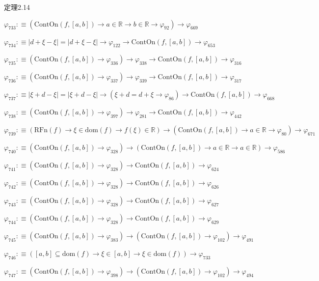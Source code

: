 \begin{fullproof}{定理2.14}
\begin{abbrevlist}
\item $\varphi_{733} :\equiv (\mathrm{ContOn}(f,[a,b]) \to a \in \mathbb{R} \to b \in \mathbb{R} \to \varphi_{92}) \to \varphi_{669}$
\item $\varphi_{734} :\equiv \lvert d + \xi - \xi \rvert = \lvert d + \xi - \xi \rvert \to \varphi_{122} \to \mathrm{ContOn}(f,[a,b]) \to \varphi_{653}$
\item $\varphi_{735} :\equiv (\mathrm{ContOn}(f,[a,b]) \to \varphi_{336}) \to \varphi_{338} \to \mathrm{ContOn}(f,[a,b]) \to \varphi_{316}$
\item $\varphi_{736} :\equiv (\mathrm{ContOn}(f,[a,b]) \to \varphi_{337}) \to \varphi_{339} \to \mathrm{ContOn}(f,[a,b]) \to \varphi_{317}$
\item $\varphi_{737} :\equiv \lvert \xi + d - \xi \rvert = \lvert \xi + d - \xi \rvert \to (\xi + d = d + \xi \to \varphi_{86}) \to \mathrm{ContOn}(f,[a,b]) \to \varphi_{668}$
\item $\varphi_{738} :\equiv (\mathrm{ContOn}(f,[a,b]) \to \varphi_{397}) \to \varphi_{281} \to \mathrm{ContOn}(f,[a,b]) \to \varphi_{442}$
\item $\varphi_{739} :\equiv (\mathrm{RFn}(f) \to \xi \in \mathrm{dom}(f) \to f(\xi) \in \mathbb{R}) \to (\mathrm{ContOn}(f,[a,b]) \to a \in \mathbb{R} \to \varphi_{80}) \to \varphi_{671}$
\item $\varphi_{740} :\equiv (\mathrm{ContOn}(f,[a,b]) \to \varphi_{328}) \to (\mathrm{ContOn}(f,[a,b]) \to a \in \mathbb{R} \to a \in \mathbb{R}) \to \varphi_{586}$
\item $\varphi_{741} :\equiv (\mathrm{ContOn}(f,[a,b]) \to \varphi_{328}) \to \mathrm{ContOn}(f,[a,b]) \to \varphi_{624}$
\item $\varphi_{742} :\equiv (\mathrm{ContOn}(f,[a,b]) \to \varphi_{328}) \to \mathrm{ContOn}(f,[a,b]) \to \varphi_{626}$
\item $\varphi_{743} :\equiv (\mathrm{ContOn}(f,[a,b]) \to \varphi_{328}) \to \mathrm{ContOn}(f,[a,b]) \to \varphi_{627}$
\item $\varphi_{744} :\equiv (\mathrm{ContOn}(f,[a,b]) \to \varphi_{328}) \to \mathrm{ContOn}(f,[a,b]) \to \varphi_{629}$
\item $\varphi_{745} :\equiv (\mathrm{ContOn}(f,[a,b]) \to \varphi_{383}) \to (\mathrm{ContOn}(f,[a,b]) \to \varphi_{102}) \to \varphi_{491}$
\item $\varphi_{746} :\equiv ([a,b] \subseteq \mathrm{dom}(f) \to \xi \in [a,b] \to \xi \in \mathrm{dom}(f)) \to \varphi_{733}$
\item $\varphi_{747} :\equiv (\mathrm{ContOn}(f,[a,b]) \to \varphi_{398}) \to (\mathrm{ContOn}(f,[a,b]) \to \varphi_{102}) \to \varphi_{494}$

\end{abbrevlist}
\end{fullproof}

